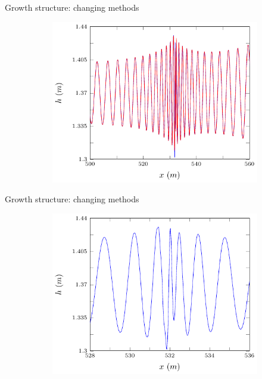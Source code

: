 \documentclass[pdf]{beamer}
\begin{document}
\begin{frame}{Growth structure: changing methods}
	\begin{figure}
		\begin{subfigure}{0.75\textwidth}
			\includegraphics[width=\textwidth]{../Pics/Models/all/2-figure0.pdf}
		\end{subfigure}
	\end{figure}
\end{frame}

\begin{frame}{Growth structure: changing methods}
	\begin{figure}
		\begin{subfigure}{0.75\textwidth}
			\includegraphics[width=\textwidth]{../Pics/Models/FD/4-figure0.pdf}
		\end{subfigure}
	\end{figure}
\end{frame}
\end{document}
